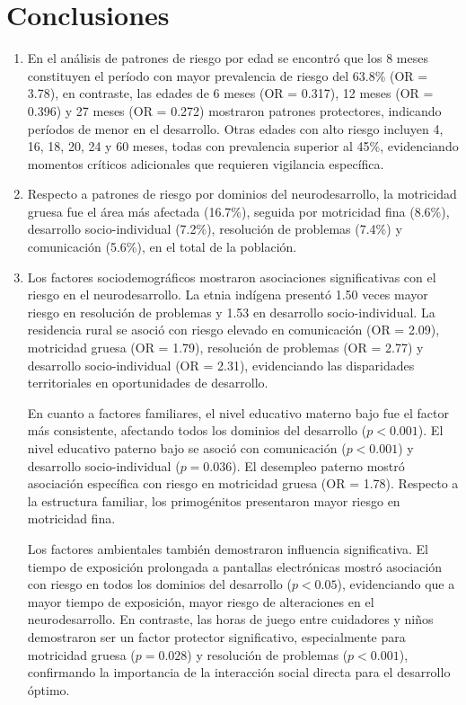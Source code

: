 \chapter{Conclusiones}

\begin{enumerate}
\item
En el análisis de patrones de riesgo por edad se encontró que los 8 meses
constituyen el período con mayor prevalencia de riesgo del 63.8\% (OR = 3.78),
en contraste, las edades de 6 meses (OR = 0.317), 12 meses
(OR = 0.396) y 27 meses (OR = 0.272) mostraron patrones protectores,
indicando períodos de menor  en el desarrollo. Otras edades con alto
riesgo incluyen 4, 16, 18, 20, 24 y 60 meses, todas con prevalencia superior
al 45\%, evidenciando momentos críticos adicionales que requieren vigilancia
específica.

\item
Respecto a patrones de riesgo por dominios del neurodesarrollo,
la motricidad gruesa fue el área más afectada (16.7\%), seguida por motricidad
fina (8.6\%), desarrollo socio-individual (7.2\%), resolución de problemas
(7.4\%) y comunicación (5.6\%), en el total de la población.

\item
Los factores sociodemográficos mostraron asociaciones significativas con el
riesgo en el neurodesarrollo. La etnia indígena presentó 1.50 veces mayor
riesgo en resolución de problemas y 1.53 en desarrollo socio-individual. La
residencia rural se asoció con riesgo elevado en comunicación (OR = 2.09),
motricidad gruesa (OR = 1.79), resolución de problemas (OR = 2.77) y
desarrollo socio-individual (OR = 2.31), evidenciando las disparidades
territoriales en oportunidades de desarrollo.

En cuanto a factores familiares, el nivel educativo materno bajo fue el
factor más consistente, afectando todos los dominios del desarrollo
($p < 0.001$). El nivel educativo paterno bajo se asoció con comunicación
($p < 0.001$) y desarrollo socio-individual ($p = 0.036$). El desempleo
paterno mostró asociación específica con riesgo en motricidad gruesa
(OR = 1.78). Respecto a la estructura familiar, los primogénitos presentaron
mayor riesgo en motricidad fina.

Los factores ambientales también demostraron influencia significativa. El
tiempo de exposición prolongada a pantallas electrónicas mostró asociación
con riesgo en todos los dominios del desarrollo ($p < 0.05$), evidenciando
que a mayor tiempo de exposición, mayor riesgo de alteraciones en el
neurodesarrollo. En contraste, las horas de juego entre cuidadores y niños
demostraron ser un factor protector significativo, especialmente para
motricidad gruesa ($p = 0.028$) y resolución de problemas ($p < 0.001$),
confirmando la importancia de la interacción social directa para el
desarrollo óptimo.


\end{enumerate}
